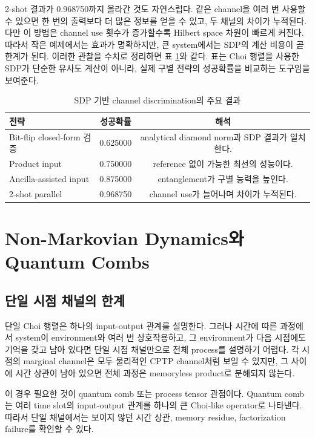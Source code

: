 \documentclass[11pt,a4paper]{article}
\begin{document}
2-shot 결과가 0.968750까지 올라간 것도 자연스럽다. 같은 channel을 여러 번 사용할 수 있으면 한 번의 출력보다 더 많은 정보를 얻을 수 있고, 두 채널의 차이가 누적된다. 다만 이 방법은 channel use 횟수가 증가할수록 Hilbert space 차원이 빠르게 커진다. 따라서 작은 예제에서는 효과가 명확하지만, 큰 system에서는 SDP의 계산 비용이 곧 한계가 된다. 이러한 관찰을 수치로 정리하면 표 \ref{tab:sdp-results}와 같다. 표는 Choi 행렬을 사용한 SDP가 단순한 유사도 계산이 아니라, 실제 구별 전략의 성공확률을 비교하는 도구임을 보여준다.

\begin{table}[H]
\centering
\begin{tabular}{lcc}
\toprule
전략 & 성공확률 & 해석 \\
\midrule
Bit-flip closed-form 검증 & 0.625000 & analytical diamond norm과 SDP 결과가 일치한다. \\
Product input & 0.750000 & reference 없이 가능한 최선의 성능이다. \\
Ancilla-assisted input & 0.875000 & entanglement가 구별 능력을 높인다. \\
2-shot parallel & 0.968750 & channel use가 늘어나며 차이가 누적된다. \\
\bottomrule
\end{tabular}
\caption{SDP 기반 channel discrimination의 주요 결과}
\label{tab:sdp-results}
\end{table}

\section{Non-Markovian Dynamics와 Quantum Combs}

\subsection{단일 시점 채널의 한계}

단일 Choi 행렬은 하나의 input-output 관계를 설명한다. 그러나 시간에 따른 과정에서 system이 environment와 여러 번 상호작용하고, 그 environment가 다음 시점에도 기억을 갖고 남아 있다면 단일 시점 채널만으로 전체 process를 설명하기 어렵다. 각 시점의 marginal channel은 모두 물리적인 CPTP channel처럼 보일 수 있지만, 그 사이에 시간 상관이 남아 있으면 전체 과정은 memoryless product로 분해되지 않는다.

이 경우 필요한 것이 quantum comb 또는 process tensor 관점이다. Quantum comb는 여러 time slot의 input-output 관계를 하나의 큰 Choi-like operator로 나타낸다. 따라서 단일 채널에서는 보이지 않던 시간 상관, memory residue, factorization failure를 확인할 수 있다.
\end{document}
